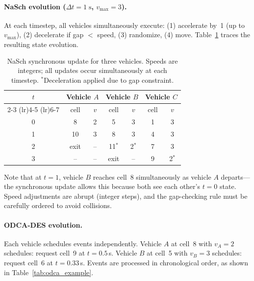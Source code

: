 \documentclass[review,authoryear]{elsarticle}
\begin{document}
\paragraph{NaSch evolution ($\Delta t = 1\;\text{s}$, $v_{\max} = 3$).}
At each timestep, all vehicles simultaneously execute: (1) accelerate by~1 (up to $v_{\max}$), (2) decelerate if gap $<$ speed, (3) randomize, (4) move. Table~\ref{tab:nasch_example} traces the resulting state evolution.

\begin{table}[ht]
\centering
\caption{NaSch synchronous update for three vehicles. Speeds are integers; all updates occur simultaneously at each timestep. $^*$Deceleration applied due to gap constraint.}
\label{tab:nasch_example}
\begin{tabular}{@{}ccccccc@{}}
\toprule
$t$ & \multicolumn{2}{c}{Vehicle $A$} & \multicolumn{2}{c}{Vehicle $B$} & \multicolumn{2}{c}{Vehicle $C$} \\
\cmidrule(lr){2-3} \cmidrule(lr){4-5} \cmidrule(lr){6-7}
 & cell & $v$ & cell & $v$ & cell & $v$ \\
\midrule
0 & 8 & 2 & 5 & 3 & 1 & 3 \\
1 & 10 & 3 & 8 & 3 & 4 & 3 \\
2 & exit & -- & 11$^*$ & 2$^*$ & 7 & 3 \\
3 & -- & -- & exit & -- & 9 & 2$^*$ \\
\bottomrule
\end{tabular}
\end{table}

Note that at $t=1$, vehicle $B$ reaches cell~8 simultaneously as vehicle $A$ departs---the synchronous update allows this because both see each other's $t=0$ state. Speed adjustments are abrupt (integer steps), and the gap-checking rule must be carefully ordered to avoid collisions.

\paragraph{ODCA-DES evolution.}
Each vehicle schedules events independently. Vehicle $A$ at cell~8 with $v_A = 2$ schedules: request cell~9 at $t = 0.5$\,s. Vehicle $B$ at cell~5 with $v_B = 3$ schedules: request cell~6 at $t = 0.33$\,s. Events are processed in chronological order, as shown in Table~\ref{tab:odca_example}.
\end{document}
